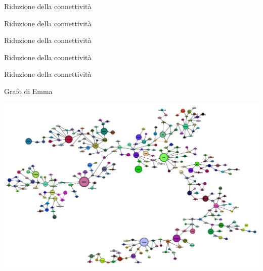 \documentclass[xcolor=x11names,compress]{beamer}
\begin{document}
\begin{frame}[t]{Riduzione della connettività}
    
\end{frame}

\begin{frame}[t]{Riduzione della connettività}
    
\end{frame}

\begin{frame}[t]{Riduzione della connettività}
    
\end{frame}

\begin{frame}[t]{Riduzione della connettività}
    
\end{frame}

\begin{frame}[t]{Riduzione della connettività}
    
\end{frame}

\begin{frame}[t]{Grafo di Emma}
    \begin{minipage}[t]{\textwidth}
        \centering
        \includegraphics[width=\textwidth]{immagini/emma_ml_lv0}
    \end{minipage}
\end{frame}
\end{document}

